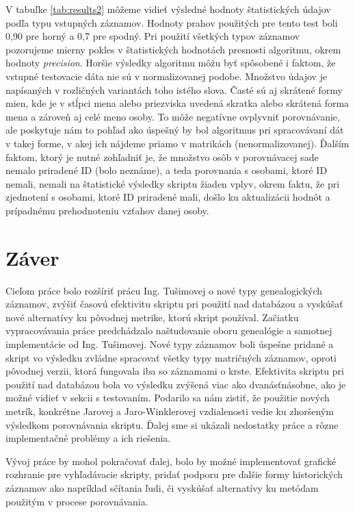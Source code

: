V tabuľke \ref{tab:results2} môžeme vidieť výsledné hodnoty štatistických údajov podľa typu vstupných záznamov. Hodnoty prahov použitých pre tento test boli 0,90 pre horný a 0,7 pre spodný. Pri použití všetkých typov záznamov pozorujeme mierny pokles v štatistických hodnotách presnosti algoritmu, okrem hodnoty \textit{precision}. Horšie výsledky algoritmu môžu byť spôsobené i faktom, že vstupné testovacie dáta nie sú v normalizovanej podobe. Množstvo údajov je napísaných v rozličných variantách toho istého slova. Časté sú aj skrátené formy mien, kde je v stĺpci mena alebo priezviska uvedená skratka alebo skrátená forma mena a zároveň aj celé meno osoby. To môže negatívne ovplyvniť porovnávanie, ale poskytuje nám to pohľad ako úspešný by bol algoritmus pri spracovávaní dát v takej forme, v akej ich nájdeme priamo v matrikách (nenormalizovanej). Ďalším faktom, ktorý je nutné zohľadniť je, že množstvo osôb v porovnávacej sade nemalo priradené ID (bolo neznáme), a teda porovnania s osobami, ktoré ID nemali, nemali na štatistické výsledky skriptu žiaden vplyv, okrem faktu, že pri zjednotení s osobami, ktoré ID priradené mali, došlo ku aktualizácii hodnôt a prípadnému prehodnoteniu vzťahov danej osoby.

\chapter{Záver}

Cieľom práce bolo rozšíriť prácu Ing. Tušimovej o nové typy genealogických záznamov, zvýšiť časovú efektivitu skriptu pri použití nad databázou a vyskúšať nové alternatívy ku pôvodnej metrike, ktorú skript používal. Začiatku vypracovávania práce predchádzalo naštudovanie oboru genealógie a samotnej implementácie od Ing. Tušimovej. Nové typy záznamov boli úspešne pridané a skript vo výsledku zvládne spracovať všetky typy matričných záznamov, oproti pôvodnej verzii, ktorá fungovala iba so záznamami o krste. Efektivita skriptu pri použití nad databázou bola vo výsledku zvýšená viac ako dvanásťnásobne, ako je možné vidieť v sekcii s testovaním. Podarilo sa nám zistiť, že použitie nových metrík, konkrétne Jarovej a Jaro-Winklerovej vzdialenosti vedie ku zhoršeným výsledkom porovnávania skriptu. Ďalej sme si ukázali nedostatky práce a rôzne implementačné problémy a ich riešenia.

Vývoj práce by mohol pokračovať ďalej, bolo by možné implementovať grafické rozhranie pre vyhľadávacie skripty, pridať podporu pre ďalšie formy historických záznamov ako napríklad sčítania ľudi, či vyskúšať alternatívy ku metódam použitým v procese porovnávania.
